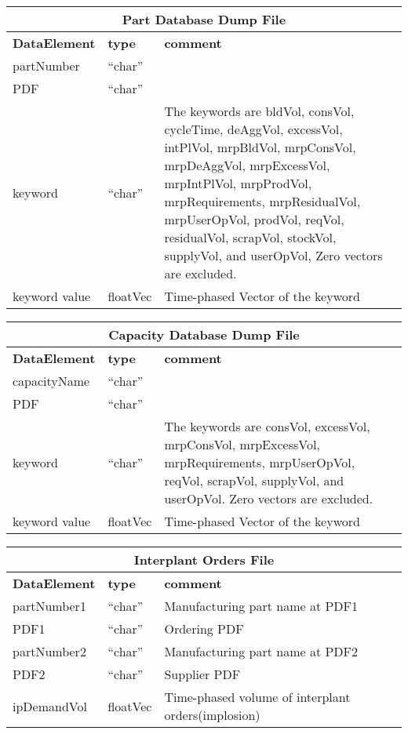 \vspace{.5in}

\begin{tabular}{llp{4in}}
\multicolumn{3}{c}{{\bf Part Database Dump File}}\\ \hline\hline
{\bf DataElement} &  {\bf type}  &   {\bf comment} \\ \hline
partNumber & ``char''  \\
PDF & ``char''  \\
keyword & ``char''  & The keywords are 
bldVol, consVol, cycleTime, deAggVol, excessVol, intPlVol, mrpBldVol, mrpConsVol, 
mrpDeAggVol, mrpExcessVol, mrpIntPlVol, mrpProdVol, mrpRequirements, mrpResidualVol,
mrpUserOpVol, prodVol, reqVol, residualVol, scrapVol, stockVol, supplyVol, 
and userOpVol, 
   Zero vectors are excluded.\\
keyword value  & floatVec &  Time-phased Vector of the keyword \\
\end{tabular}

\vspace{.5in}

\begin{tabular}{llp{4in}}
\multicolumn{3}{c}{{\bf Capacity Database Dump File}}\\ \hline\hline
{\bf DataElement} &  {\bf type}  &   {\bf comment} \\ \hline
capacityName & ``char''  \\
PDF & ``char''  \\
keyword & ``char''  & The keywords are 
consVol, excessVol, mrpConsVol, mrpExcessVol, mrpRequirements, mrpUserOpVol, 
reqVol, scrapVol, supplyVol, and userOpVol.
   Zero vectors are excluded.\\
keyword value  & floatVec &  Time-phased Vector of the keyword \\
\end{tabular}

\vspace{.5in}


\begin{tabular}{llp{4in}}
\multicolumn{3}{c}{{\bf Interplant Orders File}}\\ \hline\hline
{\bf DataElement} &  {\bf type}  &   {\bf comment} \\ \hline
partNumber1 &  ``char'' &  Manufacturing part name at PDF1  \\ 
PDF1   & ``char'' & Ordering PDF \\
partNumber2 &  ``char'' & Manufacturing part name at PDF2    \\ 
PDF2   & ``char'' & Supplier PDF \\
ipDemandVol & floatVec &  Time-phased volume of interplant orders(implosion)\\
\end{tabular}

